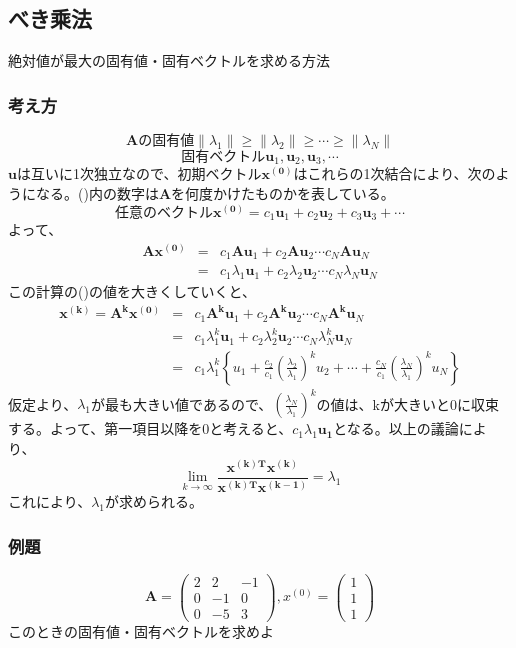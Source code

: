 \documentclass[a4j,twoside,openright,11pt]{jsarticle}
\begin{document}
\subsection{べき乘法}
絶対値が最大の固有値・固有ベクトルを求める方法
\subsubsection{考え方}
\begin{equation}
\bm{A}の固有値　\| \lambda_1 \| \geq \|\lambda_2\| \geq \cdots \geq\|\lambda_N\| \nonumber
\end{equation}
\begin{equation}
固有ベクトル　\bm{u}_1,\bm{u}_2,\bm{u}_3,\cdots \nonumber
\end{equation}
$\bm{u}$は互いに1次独立なので、初期ベクトル$\bm{x^{(0)}}$はこれらの1次結合により、次のようになる。()内の数字は$\bm{A}$を何度かけたものかを表している。
\begin{equation}
任意のベクトル　\bm{x^{(0)}}=c_1\bm{u}_1+c_2\bm{u}_2+c_3\bm{u}_3+\cdots \nonumber
\end{equation}
よって、
\begin{eqnarray}
\bm{Ax^{(0)}} &=&c_1\bm{Au}_1+c_2\bm{Au}_2 \cdots c_N\bm{Au}_N\nonumber\\
             &=&c_1\lambda_1\bm{u}_1+c_2\lambda_2\bm{u}_2 \cdots c_N\lambda_N\bm{u}_N\nonumber
\end{eqnarray}
この計算の()の値を大きくしていくと、
\begin{eqnarray}
  \bm{x^{(k)}}=\bm{A^kx^{(0)}} &=&c_1\bm{A^ku}_1+c_2\bm{A^ku}_2 \cdots c_N\bm{A^ku}_N\nonumber\\
                               &=&c_1\lambda_1^k\bm{u}_1+c_2\lambda_2^k\bm{u}_2 \cdots c_N\lambda_N^k\bm{u}_N\nonumber\\
                               &=&c_1\lambda_1^k \left\{ u_1+\frac{c_2}{c_1} \left( \frac{\lambda_2}{\lambda_1} \right)^ku_2 + \cdots + \frac{c_N}{c_1} \left( \frac{\lambda_N}{\lambda_1} \right)^ku_N \right\}
 \end{eqnarray}
仮定より、$\lambda_1$が最も大きい値であるので、$\left( \frac{\lambda_N}{\lambda_1} \right)^k$の値は、kが大きいと0に収束する。よって、第一項目以降を0と考えると、$c_1\lambda_1\bm{u_1}$となる。以上の議論により、
\[
    \lim_{k \to \infty} \frac{\bm{x^{(k)T}x^{(k)}}}{\bm{x^{(k)T}x^{(k-1)}}} = \lambda_1
\]
これにより、$\lambda_1$が求められる。
\subsubsection{例題}
\begin{equation}
\bm{A}=\left(
\begin{array}{ccc}
2&2&-1\\
0&-1&0\\
0&-5&3
\end{array}
\right),x^{(0)}=
\begin{pmatrix}
1\\
1\\
1
\end{pmatrix}
\end{equation}
このときの固有値・固有ベクトルを求めよ\\
\end{document}
